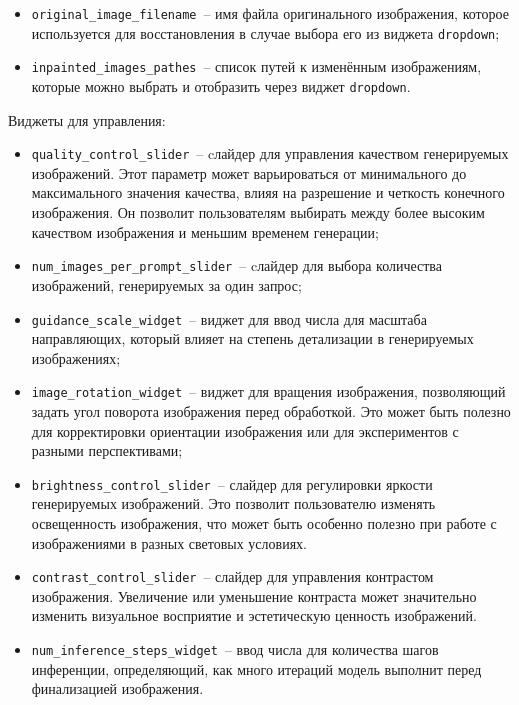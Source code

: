 \begin{itemize}
    \item \lstinline{original_image_filename}~-- имя файла оригинального изображения, которое используется для восстановления в случае выбора его из виджета \lstinline{dropdown};
    \item \lstinline{inpainted_images_pathes}~-- список путей к изменённым изображениям, которые можно выбрать и отобразить через виджет \lstinline{dropdown}.
\end{itemize}

Виджеты для управления:

\begin{itemize}
    \item \lstinline{quality_control_slider}~-- cлайдер для управления качеством генерируемых изображений. Этот параметр может варьироваться от минимального до максимального значения качества, влияя на разрешение и четкость конечного изображения. Он позволит пользователям выбирать между более высоким качеством изображения и меньшим временем генерации;
    \item \lstinline{num_images_per_prompt_slider}~-- cлайдер для выбора количества изображений, генерируемых за один запрос;
    \item \lstinline{guidance_scale_widget}~-- виджет для ввод числа для масштаба направляющих, который влияет на степень детализации в генерируемых изображениях;
    \item \lstinline{image_rotation_widget}~-- виджет для вращения изображения, позволяющий задать угол поворота изображения перед обработкой. Это может быть полезно для корректировки ориентации изображения или для экспериментов с разными перспективами;
    \item \lstinline{brightness_control_slider}~-- слайдер для регулировки яркости генерируемых изображений. Это позволит пользователю изменять освещенность изображения, что может быть особенно полезно при работе с изображениями в разных световых условиях.
    \item \lstinline{contrast_control_slider}~-- слайдер для управления контрастом изображения. Увеличение или уменьшение контраста может значительно изменить визуальное восприятие и эстетическую ценность изображений.
    \item \lstinline{num_inference_steps_widget}~-- ввод числа для количества шагов инференции, определяющий, как много итераций модель выполнит перед финализацией изображения.
\end{itemize}

